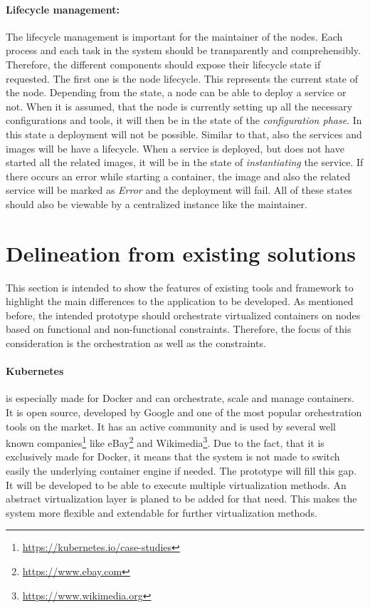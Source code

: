 \paragraph{Lifecycle management:}
The lifecycle management is important for the maintainer of the nodes.
Each process and each task in the system should be transparently and comprehensibly.
Therefore, the different components should expose their lifecycle state if requested.
The first one is the node lifecycle.
This represents the current state of the node.
Depending from the state, a node can be able to deploy a service or not.
When it is assumed, that the node is currently setting up all the necessary configurations and tools, it will then be in the state of the \textit{configuration phase}.
In this state a deployment will not be possible.
Similar to that, also the services and images will be have a lifecycle.
When a service is deployed, but does not have started all the related images, it will be in the state of \textit{instantiating} the service.
If there occurs an error while starting a container, the image and also the related service will be marked as \textit{Error} and the deployment will fail.
All of these states should also be viewable by a centralized instance like the maintainer.


\section{Delineation from existing solutions}
\label{section:delineation-from-existing-solutions}
This section is intended to show the features of existing tools and framework to highlight the main differences to the application to be developed.
As mentioned before, the intended prototype should orchestrate virtualized containers on nodes based on functional and non-functional constraints.
Therefore, the focus of this consideration is the orchestration as well as the constraints.

\paragraph{Kubernetes} is especially made for Docker and can orchestrate, scale and manage containers.
It is open source, developed by Google and one of the most popular orchestration tools on the market.
It has an active community and is used by several well known companies\footnote{\url{https://kubernetes.io/case-studies}} like eBay\footnote{\url{https://www.ebay.com}} and Wikimedia\footnote{\url{https://www.wikimedia.org}}.
Due to the fact, that it is exclusively made for Docker, it means that the system is not made to switch easily the underlying container engine if needed.
The prototype will fill this gap.
It will be developed to be able to execute multiple virtualization methods.
An abstract virtualization layer is planed to be added for that need.
This makes the system more flexible and extendable for further virtualization methods.

